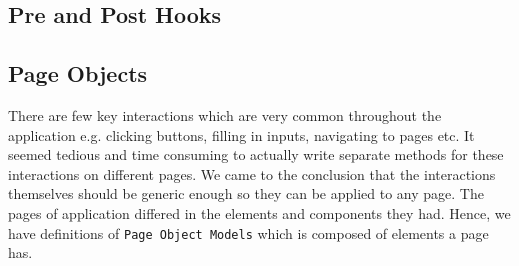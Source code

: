 \subsection{Pre and Post Hooks}
\label{subsec:pre-and-post-hooks}

\subsection{Page Objects}
\label{subsec:page-objects}
There are few key interactions which are very common throughout the application e.g. clicking buttons, filling in inputs, navigating to pages etc. It seemed tedious and time consuming to actually write separate methods for these interactions on different pages. We came to the conclusion that the interactions themselves should be generic enough so they can be applied to any page. The pages of application differed in the elements and components they had. Hence, we have definitions of \texttt{Page Object Models} which is composed of elements a page has.


